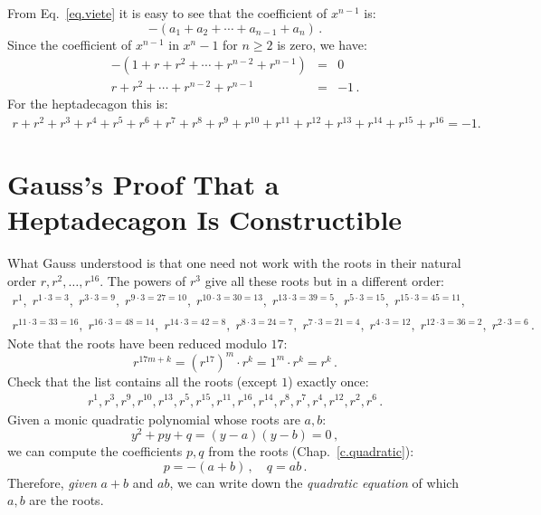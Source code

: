 From Eq.~\ref{eq.viete} it is easy to see that the coefficient of $x^{n-1}$ is:
\[
-(a_1+a_2+\cdots+a_{n-1}+a_n)\,.
\]
Since the coefficient of $x^{n-1}$ in $x^n-1$ for $n\geq 2$ is zero, we have:
\begin{eqnarray*}
-(1+r+r^2+\cdots + r^{n-2}+r^{n-1})&=&0\\
r+r^2+\cdots + r^{n-2}+r^{n-1}&=&-1\,.
\end{eqnarray*}
For the heptadecagon this is:
\begin{align}
r+r^2+r^3+r^4+r^5+r^6+r^7+r^8+r^9+r^{10}+r^{11}+r^{12}+r^{13}+r^{14} + r^{15}+r^{16}=-1.\label{eq.minus-one}
\end{align}

\section{Gauss's Proof That a Heptadecagon Is Constructible}\label{s.gauss}

What Gauss understood is that one need not work with the roots in their natural order $r,r^2,\ldots,r^{16}$. The powers of $r^3$ give all these roots but in a different order:
\[
\begin{array}{l}
r^1, \;r^{1\cdot 3 =3},\; r^{3\cdot 3=9},\; r^{9\cdot 3=27=10},\; r^{10\cdot 3=30=13},\; r^{13\cdot 3=39=5},\; r^{5\cdot 3=15},\; r^{15\cdot 3=45=11},\\\\
r^{11\cdot 3 =33=16}, \;r^{16\cdot 3=48=14},\; r^{14\cdot 3=42=8},\; r^{8\cdot 3=24=7},\;r^{7\cdot 3=21=4},\; r^{4\cdot 3=12},\; r^{12\cdot 3=36=2},\; r^{2\cdot 3=6}\,.
\end{array}
\]
Note that the roots have been reduced modulo $17$:
\[
r^{17m+k}=(r^{17})^m\cdot r^k=1^m\cdot r^k=r^k\,.
\]
Check that the list contains all the roots (except $1$) exactly once:
\begin{align}\label{eq.roots}
r^1, r^3, r^9, r^{10}, r^{13}, r^5, r^{15}, r^{11}, r^{16}, r^{14}, r^8, r^7, r^4, r^{12}, r^2, r^6\,.
\end{align}
Given a monic quadratic polynomial whose roots are $a,b$:
\[
y^2+py+q=(y-a)(y-b)=0\,,
\]
we can compute the coefficients $p,q$ from the roots (Chap.~\ref{c.quadratic}):
\[
p=-(a+b)\,,\quad q=ab\,.
\]
Therefore, \emph{given} $a+b$ and $ab$, we can write down the \emph{quadratic equation} of which $a,b$ are the roots.

